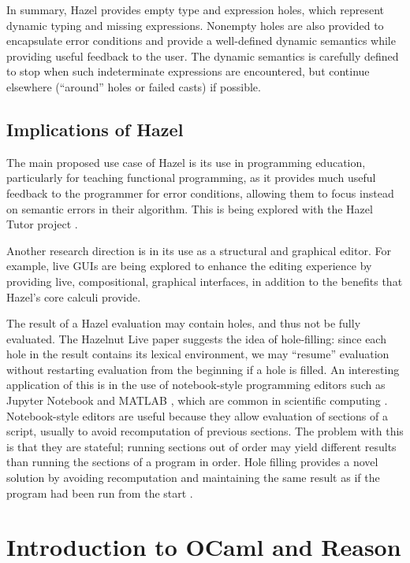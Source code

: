 In summary, Hazel provides empty type and expression holes, which represent dynamic typing and missing expressions. Nonempty holes are also provided to encapsulate error conditions and provide a well-defined dynamic semantics while providing useful feedback to the user. The dynamic semantics is carefully defined to stop when such indeterminate expressions are encountered, but continue elsewhere (``around'' holes or failed casts) if possible.

\subsection{Implications of Hazel}
\label{sec:hazel-implications}

The main proposed use case of Hazel is its use in programming education, particularly for teaching functional programming, as it provides much useful feedback to the programmer for error conditions, allowing them to focus instead on semantic errors in their algorithm. This is being explored with the Hazel Tutor project \cite{potter2020hazel}.

Another research direction is in its use as a structural and graphical editor. For example, live GUIs \cite{omar2021filling} are being explored to enhance the editing experience by providing live, compositional, graphical interfaces, in addition to the benefits that Hazel's core calculi provide.

The result of a Hazel evaluation may contain holes, and thus not be fully evaluated. The Hazelnut Live paper \cite{conf/popl/HazelnutLive19} suggests the idea of hole-filling: since each hole in the result contains its lexical environment, we may ``resume'' evaluation without restarting evaluation from the beginning if a hole is filled. An interesting application of this is in the use of notebook-style programming editors such as Jupyter Notebook  and MATLAB , which are common in scientific computing . Notebook-style editors are useful because they allow evaluation of sections of a script, usually to avoid recomputation of previous sections. The problem with this is that they are stateful; running sections out of order may yield different results than running the sections of a program in order. Hole filling provides a novel solution by avoiding recomputation and maintaining the same result as if the program had been run from the start .

\section{Introduction to OCaml and Reason}
\label{sec:ocaml-intro}

